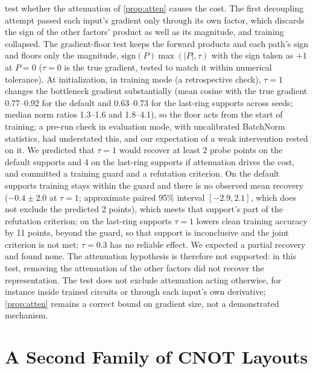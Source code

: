  test whether the attenuation of \cref{prop:atten} causes the cost.
The first decoupling attempt passed each input's gradient only through its own factor, which
discards the sign of the other factors' product as well as its magnitude, and training collapsed.
The gradient-floor test keeps the forward products and each path's sign and floors only the
magnitude, $\mathrm{sign}(P)\max(|P|,\tau)$ with the sign taken as $+1$ at $P=0$ ($\tau=0$ is the
true gradient, tested to match it within numerical tolerance). At initialization, in training mode (a retrospective check), $\tau=1$
changes the bottleneck gradient substantially (mean cosine with the true gradient 0.77--0.92 for the default and 0.63--0.73
for the last-ring supports across seeds; median norm ratios 1.3--1.6 and 1.8--4.1), so the floor acts
from the start of training; a pre-run check in evaluation mode, with uncalibrated BatchNorm statistics,
had understated this, and our expectation of a weak intervention rested on it. We predicted that
$\tau=1$ would recover at least 2 probe points on the default supports and 4 on the last-ring
supports if attenuation drives the cost, and committed a training guard and a refutation
criterion. On the default supports training stays within the guard and there is no observed mean
recovery ($-0.4\pm2.0$ at $\tau=1$; approximate paired 95\% interval $[-2.9,2.1]$, which does not
exclude the predicted 2 points), which meets that support's part of the refutation
criterion; on the last-ring supports $\tau=1$ lowers clean training accuracy by 11 points, beyond
the guard, so that support is inconclusive and the joint criterion is not met; $\tau=0.3$ has no
reliable effect. We expected a partial recovery and found none. The attenuation hypothesis is
therefore not supported: in this test, removing the attenuation of the other factors did not
recover the representation. The test does not exclude attenuation acting otherwise, for instance
inside trained circuits or through each input's own derivative; \cref{prop:atten} remains a
correct bound on gradient size, not a demonstrated mechanism.



\section{A Second Family of CNOT Layouts}
\label{app:family}



